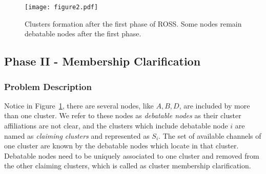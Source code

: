 

\begin{figure}[ht!]
  \centering
  \texttt{[image: figure2.pdf]}
  \caption{Clusters formation after the first phase of ROSS. Some nodes remain debatable nodes after the first phase.}\label{fig2}
\end{figure}


\subsection{Phase II - Membership Clarification}
\subsubsection{Problem Description}
Notice in Figure~\ref{fig2}, there are several nodes, like $A, B, D$, are included by more than one cluster. 
We refer to these nodes as \textit{debatable nodes} as their cluster affiliations are not clear, and the clusters which include debatable node $i$ are named as \textit{claiming clusters} and represented as $S_i$. 
The set of available channels of one cluster are known by the debatable nodes which locate in that cluster. %
Debatable nodes need to be uniquely associated to one cluster and removed from the other claiming clusters, which is called as cluster membership clarification.

%

